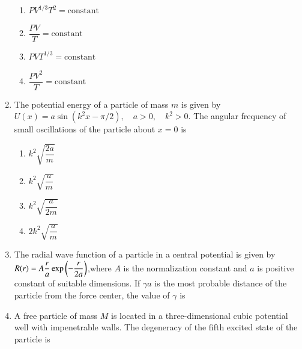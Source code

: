 \documentclass[journal,12pt,onecolumn]{IEEEtran}
\theoremstyle{remark}
\begin{document}
\begin{enumerate}
    \begin{enumerate}
        \item $P V^{1/3} T^2 = \text{constant}$
        \item $\dfrac{P V}{T} = \text{constant}$
        \item $P V T^{1/3} = \text{constant}$
        \item $\dfrac{P V^2}{T} = \text{constant}$
    \end{enumerate}
    
    \item The potential energy of a particle of mass $m$ is given by
    $
        U(x) = a \sin (k^2 x - \pi/2), \quad a > 0,\quad k^2 > 0.
    $
    The angular frequency of small oscillations of the particle about $x=0$ is
    
    \begin{enumerate}
        \item $k^2 \sqrt{\dfrac{2a}{m}}$
        \item $k^2 \sqrt{\dfrac{a}{m}}$
        \item $k^2 \sqrt{\dfrac{a}{2m}}$
        \item $2k^2 \sqrt{\dfrac{a}{m}}$
    \end{enumerate}
    

    \item The radial wave function of a particle in a central potential is given by
    $
        R(r) = A \dfrac{r}{a} \exp\left(-\dfrac{r}{2a}\right)
    $,where $A$ is the normalization constant and $a$ is positive constant of suitable dimensions. If $\gamma a$ is the most probable distance of the particle from the force center, the value of $\gamma$ is \underline{\hspace{2cm}}
    
    \item A free particle of mass $M$ is located in a three-dimensional cubic potential well with impenetrable walls. The degeneracy of the fifth excited state of the particle is \underline{\hspace{2cm}}
    

\end{enumerate}
\end{document}
